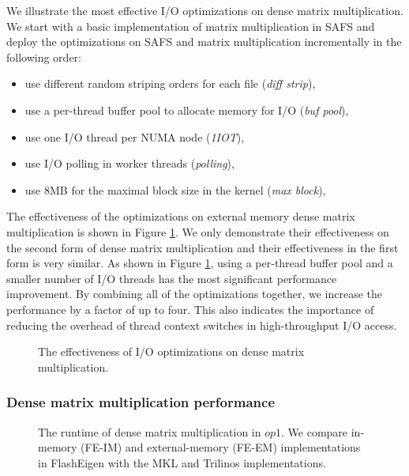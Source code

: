 We illustrate the most effective I/O optimizations on dense matrix
multiplication. We start with a basic implementation of matrix multiplication
in SAFS and deploy the optimizations on SAFS and matrix multiplication
incrementally in the following order:
\begin{itemize} \itemsep1pt \parskip0pt 
	\item use different random striping orders for each file (\textit{diff strip}),
	\item use a per-thread buffer pool to allocate memory for I/O (\textit{buf pool}),
	\item use one I/O thread per NUMA node (\textit{1IOT}),
	\item use I/O polling in worker threads (\textit{polling}),
	\item use 8MB for the maximal block size in the kernel (\textit{max block}),
\end{itemize}

The effectiveness of the optimizations on external memory dense matrix
multiplication is shown in Figure \ref{perf:dmm_opts}. We only demonstrate
their effectiveness on the second form of dense matrix multiplication and
their effectiveness in the first form is very similar. As shown in Figure
\ref{perf:dmm_opts}, using a per-thread buffer pool and a smaller number
of I/O threads has the most significant performance improvement. By combining
all of the optimizations together, we increase the performance by a factor
of up to four. This also indicates the importance of reducing the overhead
of thread context switches in high-throughput I/O access.

\begin{figure}
	\begin{center}
		\footnotesize
		\vspace{-15pt}
		
		\vspace{-15pt}
		\caption{The effectiveness of I/O optimizations on dense matrix
		multiplication.}
		\label{perf:dmm_opts}
	\end{center}
\end{figure}

\subsubsection{Dense matrix multiplication performance}

\begin{figure}
	\begin{center}
		\footnotesize
		\vspace{-15pt}
		
		\vspace{-15pt}
		\caption{The runtime of dense matrix multiplication in $op1$. We compare
			in-memory (FE-IM) and external-memory (FE-EM) implementations
			in FlashEigen with the MKL and Trilinos implementations.}
		\label{perf:gemm}
	\end{center}
\end{figure}

